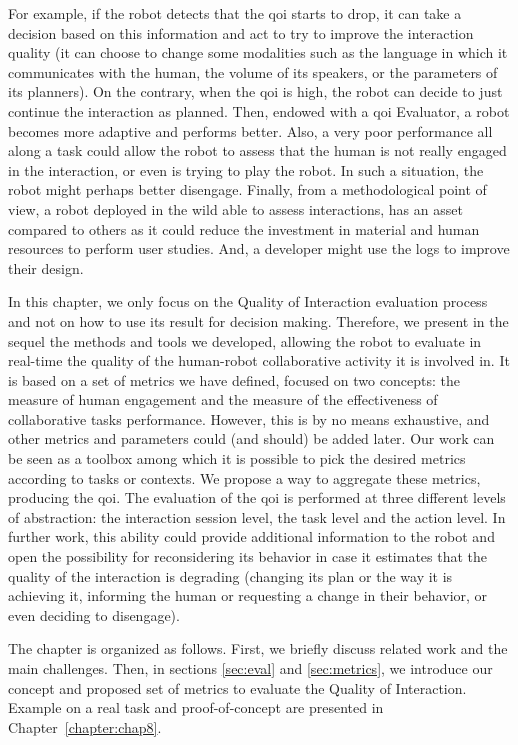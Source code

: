 \documentclass[a4paper,11pt,twoside]{StyleThese}
\begin{document}
For example, if the robot detects that the \acrshort{qoi} starts to drop, it can take a decision based on this information and act to try to improve the interaction quality (\eg it can choose to change some modalities such as the language in which it communicates with the human, the volume of its speakers, or the parameters of its planners). On the contrary, when the \acrshort{qoi} is high, the robot can decide to just continue the interaction as planned. Then, endowed with a \acrshort{qoi} Evaluator, a robot becomes more adaptive and performs better. Also, a very poor performance all along a task could allow the robot to assess that the human is not really engaged in the interaction, or even is trying to play the robot. In such a situation, the robot might perhaps better disengage. 
Finally, from a methodological point of view, a robot deployed in the wild able to assess interactions, has an asset compared to others as it could reduce the investment in material and human resources to perform user studies. And, a developer might use the logs to improve their design. 

In this chapter, we only focus on the Quality of Interaction evaluation process and not on how to use its result for decision making. Therefore,  we present in the sequel the methods and tools we developed, allowing the robot to evaluate in real-time the quality of the human-robot collaborative activity it is involved in. It is based on a set of metrics we have defined, focused on two concepts: the measure of human engagement and the measure of the effectiveness of collaborative tasks performance. However, this is by no means exhaustive, and other metrics and parameters could (and should) be added later. Our work can be seen as a toolbox among which it is possible to pick the desired metrics according to tasks or contexts. We propose a way to aggregate these metrics, producing the \acrshort{qoi}. The evaluation of the \acrshort{qoi} is performed at three different levels of abstraction: the interaction session level, the task level and the action level. In further work, this ability could provide additional information to the robot and open the possibility for reconsidering its behavior in case it estimates that the quality of the interaction is degrading (\eg changing its plan or the way it is achieving it, informing the human or requesting a change in their behavior, or even deciding to disengage).

The chapter is organized as follows. First, we briefly discuss related work and the main challenges. Then, in sections \ref{sec:eval} and \ref{sec:metrics}, we introduce our concept and proposed set of metrics to evaluate the Quality of Interaction. Example on a real task and proof-of-concept are presented in Chapter~\ref{chapter:chap8}.
\end{document}

